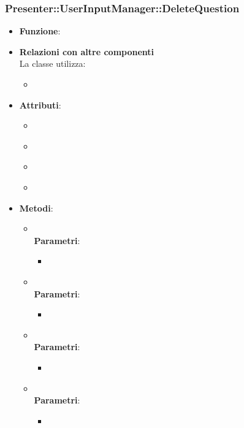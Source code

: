 \subsubsection{Presenter::UserInputManager::DeleteQuestion}
\begin{itemize}
\item\textbf{Funzione}:
\item\textbf{Relazioni con altre componenti}\\
La classe utilizza:
	\begin{itemize}
		\item
	\end{itemize}
\item\textbf{Attributi}:
	\begin{itemize}
		\item\code{}\\
		\item\code{}\\
		\item\code{}\\
		\item\code{}\\
	\end{itemize}
\item\textbf{Metodi}:
	\begin{itemize}
		\item\code{}\\
		\textbf{Parametri}:
			\begin{itemize}
				\item\code{}\\
			\end{itemize}
		\item\code{}\\
		\textbf{Parametri}:
			\begin{itemize}
				\item\code{}\\
			\end{itemize}
		\item\code{}\\
		\textbf{Parametri}:
			\begin{itemize}
				\item\code{}\\
			\end{itemize}
		\item\code{}\\
		\textbf{Parametri}:
			\begin{itemize}
				\item\code{}\\
			\end{itemize}
	\end{itemize}
\end{itemize}

